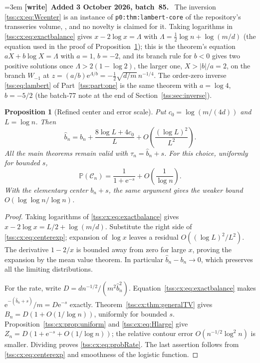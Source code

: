 \documentclass[11pt]{article}
\newtheorem{proposition}[theorem]{Proposition}
\theoremstyle{remark}\newtheorem{remark}[theorem]{Remark}
\theoremstyle{definition}\newtheorem{definition}[theorem]{Definition}
\newcommand{\e}{\mathrm e}
\newcommand{\Prob}{\mathbb P}
\newcommand{\Cev}{\mathcal C_n}
\newenvironment{writenote}[1][]{\par\smallskip\begingroup\small\emergencystretch=3em
 \noindent\textbf{[write]}\if\relax\detokenize{#1}\relax\else~\textbf{#1.}\fi\ }%
 {\par\endgroup\smallskip}
\begin{document}
\begin{writenote}[Added 3 October 2026, batch~85]
The inversion \eqref{tss:cx:eq:Wcenter} is an instance of
\texttt{p0:thm:lambert-core} of the repository's transseries volume,
,
and no novelty is claimed for it. Taking logarithms in
\eqref{tss:cx:eq:exactbalance} gives $x-2\log x=\Lambda$ with
$\Lambda=\tfrac12\log n+\log(m/d)$ (the equation used in the proof of
Proposition~\ref{tss:cx:prop:center}); this is the theorem's equation
$aX+b\log X=\Lambda$ with $a=1$, $b=-2$, and its branch rule for $b<0$ gives
two positive solutions once $\Lambda>2(1-\log2)$, the larger one,
$X>|b|/a=2$, on the branch $W_{-1}$ at
$z=(a/b)\e^{\Lambda/b}=-\tfrac12\sqrt{d/m}\,n^{-1/4}$. The order-zero inverse
\eqref{tss:eq:lambert} of Part~\ref{tss:part:one} is the same theorem with
$a=\log4$, $b=-5/2$ (the batch-77 note at the end of
Section~\ref{tss:sec:inverse}).
\end{writenote}

\begin{proposition}[Refined center and error scale]\label{tss:cx:prop:center}
Put $c_0=\log(m/(4d))$ and $L=\log n$. Then
\begin{equation}\label{tss:cx:eq:centerexp}
 \widehat b_n=b_n+\frac{8\log L+4c_0}{L}
             +O\left(\frac{(\log L)^2}{L^2}\right).
\end{equation}
All the main theorems remain valid with $\tau_n=\widehat b_n+s$.
For this choice, uniformly for bounded $s$,
\begin{equation}\label{tss:cx:eq:probRate}
 \Prob(\Cev)=\frac1{1+\e^{-s}}
             +O\left(\frac1{\log n}\right).
\end{equation}
With the elementary center $b_n+s$, the same argument gives the
weaker bound $O(\log\log n/\log n)$.
\end{proposition}
\begin{proof}
Taking logarithms of \eqref{tss:cx:eq:exactbalance} gives
$x-2\log x=L/2+\log(m/d)$. Substitute the right side of
\eqref{tss:cx:eq:centerexp}; expansion of $\log x$ leaves a residual
$O((\log L)^2/L^2)$. The derivative $1-2/x$ is bounded away from
zero for large $x$, proving the expansion by the mean value theorem.
In particular $\widehat b_n-b_n\to0$, which preserves all the
limiting distributions.

For the rate, write
$D=d n^{-1/2}/(m^2\widehat b_n^2)$.
Equation~\eqref{tss:cx:eq:exactbalance} makes
$\e^{-(\widehat b_n+s)}/m=D\e^{-s}$ exactly. Theorem~\ref{tss:cx:thm:generalTV}
gives $B_n=D(1+O(1/\log n))$, uniformly for bounded $s$.
Proposition~\ref{tss:cx:prop:uniform} and \eqref{tss:cx:eq:Hlarge} give
$Z_n=D(1+\e^{-s}+O(1/\log n))$; the relative contour error
$O(n^{-1/2}\log^2 n)$ is smaller. Dividing proves
\eqref{tss:cx:eq:probRate}. The last assertion follows from
\eqref{tss:cx:eq:centerexp} and smoothness of the logistic function.
\end{proof}
\end{document}
